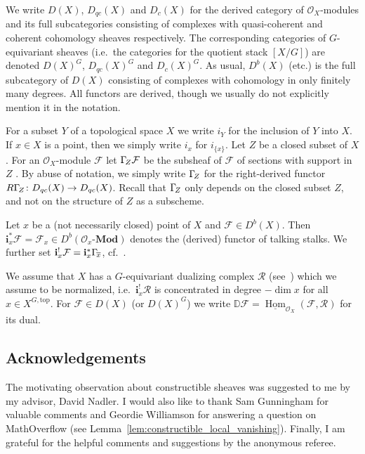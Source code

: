 \documentclass{compositio}
\theoremstyle{plain}
\theoremstyle{definition}
\theoremstyle{remark}
\newcommand\sheaf{\mathcal}
\newcommand\sO{\sheaf{O}}
\newcommand\cat{\mathbf}
\newcommand\catModules[1]{#1\text{-}\cat{Mod}}
\newcommand\sheafHom{\underline{\operatorname{Hom}}}
\newcommand\dualize{\mathbb D}
\newcommand\lc[1]{\Gamma_{\mkern-3mu#1}}
\newcommand\Xtop[1][X]{#1^{G,\mathrm{top}}}
\begin{document}
We write $D(X)$, $D_{qc}(X)$ and $D_c(X)$ for the derived category of $\sO_X$-modules and its full subcategories consisting of complexes with quasi-coherent and coherent cohomology sheaves respectively.
The corresponding categories of $G$-equivariant sheaves (i.e.\ the categories for the quotient stack $[X/G]$) are denoted $D(X)^G$, $D_{qc}(X)^G$ and $D_c(X)^G$.
As usual, $D^b(X)$ (etc.) is the full subcategory of $D(X)$ consisting of complexes with cohomology in only finitely many degrees.
All functors are derived, though we usually do not explicitly mention it in the notation.

For a subset $Y$ of a topological space $X$ we write $i_Y$ for the inclusion of $Y$ into $X$. 
If $x \in  X$ is a point, then we simply write $i_x$ for $i_{\{x\}}$.
Let $Z$ be a closed subset of $X$.
For an $\sO_X$-module $\sheaf F$ let $\lc Z\sheaf F$ be the subsheaf of $\sheaf F$ of sections with support in $Z$ \cite[Variation~3 in IV.1]{Hartshorne:1966:ResiduesAndDuality}.
By abuse of notation, we simply write $\lc Z$ for the right-derived functor $R\lc Z\colon D_{qc}(X) \to  D_{qc}(X)$.
Recall that $\lc Z$ only depends on the closed subset $Z$, and not on the structure of $Z$ as a subscheme.

Let $x$ be a (not necessarily closed) point of $X$ and $\sheaf F \in  D^b(X)$.
Then $\mathbf i_x^*\sheaf F = \sheaf F_x \in  D^b(\catModules{\sO_x})$ denotes the (derived) functor of talking stalks.
We further set $\mathbf i_x^!\sheaf F = \mathbf i_x^*\lc {\overline x}$, cf.~\cite[Variation~8 in IV.1]{Hartshorne:1966:ResiduesAndDuality}.

We assume that $X$ has a $G$-equivariant dualizing complex $\sheaf R$ (see~\cite[Definition~1]{Bezrukavnikov:arXiv:PerverseCoherentSheaves}) which we assume to be normalized, i.e.\ $\mathbf i_x^! \sheaf R$ is concentrated in degree $-\dim x$ for all $x \in  \Xtop$.
For $\sheaf F \in  D(X)$ (or $D(X)^G$) we write $\dualize \sheaf F = \sheafHom_{\sO_X}(\sheaf F,\sheaf R)$ for its dual.

\subsection{Acknowledgements}

The motivating observation about constructible sheaves was suggested to me by my advisor, David Nadler.
I would also like to thank Sam Gunningham for valuable comments and Geordie Williamson for answering a question on MathOverflow (see Lemma~\ref{lem:constructible_local_vanishing}).
Finally, I am grateful for the helpful comments and suggestions by the anonymous referee.
\end{document}
